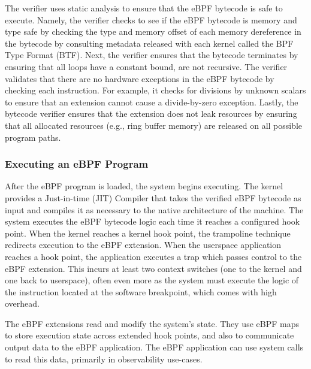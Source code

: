 The verifier uses static analysis to ensure that the eBPF bytecode is safe to execute.  Namely, the verifier checks to see if the eBPF bytecode is memory and type safe by checking the type and memory offset of each memory dereference in the bytecode by consulting metadata released with each kernel called the BPF Type Format (BTF).  Next, the verifier ensures that the bytecode terminates by ensuring that all loops have a constant bound, are not recursive.  The verifier validates that there are no hardware exceptions in the eBPF bytecode by checking each instruction.  For example, it checks for divisions by unknown scalars to ensure that an extension cannot cause a divide-by-zero exception.  Lastly, the bytecode verifier ensures that the extension does not leak resources by ensuring that all allocated resources (e.g., ring buffer memory) are released on all possible program paths.

\subsubsection{Executing an eBPF Program}

After the eBPF program is loaded, the system begins executing.  The kernel provides a Just-in-time (JIT) Compiler that takes the verified eBPF bytecode as input and compiles it as necessary to the native architecture of the machine.  The system executes the eBPF bytecode logic each time it reaches a configured hook point.  When the kernel reaches a kernel hook point, the trampoline technique redirects execution to the eBPF extension.  When the userspace application reaches a hook point, the application executes a trap which passes control to the eBPF extension.  This incurs at least two context switches (one to the kernel and one back to userspace), often even more as the system must execute the logic of the instruction located at the software breakpoint, which comes with high overhead.

The eBPF extensions read and modify the system's state.  They use eBPF maps to store execution state across extended hook points, and also to communicate output data to the eBPF application.  The eBPF application can use system calls to read this data, primarily in observability use-cases. 

